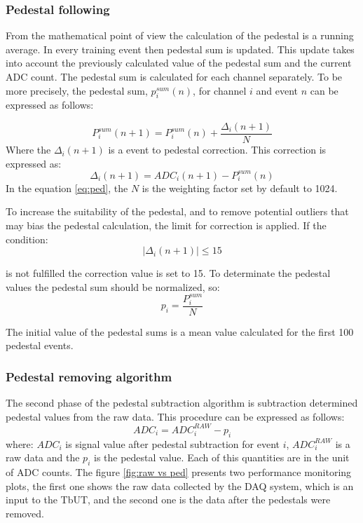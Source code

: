 \subsubsection{Pedestal following}
From the mathematical point of view the calculation of the pedestal is a running average. In every training event then pedestal sum is updated. This update takes into account the previously calculated value of the pedestal sum and the current ADC count. The pedestal sum is calculated for each channel separately. To be more precisely, the pedestal sum, $p^{sum}_i(n)$, for channel $i$ and event $n$ can be expressed as follows:

\begin{equation}
P_{i}^{sum}(n+1)=P^{sum}_{i}(n) + \frac{\Delta_{i}(n+1)}{N}
\label{eq:ped}
\end{equation}
Where the $\Delta_{i}(n+1)$ is a event to pedestal correction. This correction is expressed as:
\begin{equation}
\Delta_{i}(n+1)=ADC_{i}(n+1)-P^{sum}_{i}(n)
\end{equation}
In the equation \ref{eq:ped}, the $N$ is the weighting factor set by default to 1024. 


To increase the suitability of the pedestal, and to remove potential outliers that may bias the pedestal calculation, the limit for correction is applied. If the condition:
\begin{equation} 
\left| \Delta_{i}(n+1) \right| \leq 15  
\end{equation}

is not fulfilled the correction value is set to 15. To determinate the pedestal values the pedestal sum should be normalized, so:
\begin{equation}
p_{i}=\frac{P^{sum}_{i}}{N}
\end{equation}

The initial value of the pedestal sums is a mean value calculated for the first 100 pedestal events. 

\subsubsection{Pedestal removing algorithm}
The second phase of the pedestal subtraction algorithm is subtraction determined pedestal values from the raw data. This procedure can be expressed as follows:
\begin{equation}
ADC_{i}=ADC^{RAW}_{i}-p_{i}
\end{equation} 
where: $ADC_{i}$ is signal value after pedestal subtraction for event $i$, $ADC^{RAW}_{i}$ is a raw data and the $p_{i}$ is the pedestal value. Each of this quantities are in the unit of ADC counts. 
The figure \ref{fig:raw vs ped} presents two performance monitoring plots, the first one shows the raw data collected by the DAQ system, which is an input to the TbUT, and the second one is the data after the pedestals were removed.  

